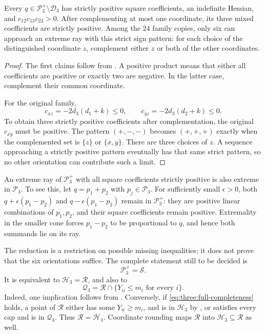 \begin{corollary}\label{three:reduction}
Every $q\in\mathcal P_3^+\setminus \mathcal D_3$ has strictly positive square
coefficients, an indefinite Hessian, and
$c_{12}c_{13}c_{23}>0$. After complementing at most one coordinate, its
three mixed coefficients are strictly positive. Among the $24$ family
copies, only six can approach an extreme ray with this strict sign
pattern: for each choice of the distinguished coordinate $z$, complement
either $z$ or both of the other coordinates.
\end{corollary}
\begin{proof}
The first claims follow from .
A positive product means that either all coefficients are positive or
exactly two are negative. In the latter case, complement their common
coordinate.

For the original family,
\[
 c_{xz}=-2d_3(d_1+k)\le0,\qquad
 c_{yz}=-2d_3(d_2+k)\le0.
\]
To obtain three strictly positive coefficients after complementation,
the original $c_{xy}$ must be positive. The pattern $(+,-,-)$ becomes
$(+,+,+)$ exactly when the complemented set is $\{z\}$ or $\{x,y\}$.
There are three choices of $z$. A sequence approaching a strictly positive
pattern eventually has that same strict pattern, so no other orientation
can contribute such a limit.
\end{proof}

An extreme ray of $\mathcal P_3^+$ with all square coefficients strictly
positive is also extreme in $\mathcal P_3$. To see this, let
$q=p_1+p_2$ with $p_j\in\mathcal P_3$. For sufficiently small
$\epsilon>0$, both $q+\epsilon(p_1-p_2)$ and
$q-\epsilon(p_1-p_2)$ remain in $\mathcal P_3^+$: they are positive
linear combinations of $p_1,p_2$, and their square coefficients remain
positive. Extremality in the smaller cone forces $p_1-p_2$ to be
proportional to $q$, and hence both summands lie on its ray.

The reduction is a restriction on possible missing inequalities; it does
not prove that the six orientations suffice. The complete statement
still to be decided is
\begin{equation}\label{eq:three:completeness}
 \mathcal P_3^+=\mathcal S.
\end{equation}
It is equivalent to $\mathcal H_3=\mathcal R$, and also to
\begin{equation}\label{eq:three:full-completeness}
 \mathcal Q_3=\mathcal R\cap\{Y_{ii}\le m_i\text{ for every }i\}.
\end{equation}
Indeed, one implication follows from . Conversely, if
\eqref{eq:three:full-completeness} holds, a point of $\mathcal R$ either has some
$Y_{ii}\ge m_i$, and is in $\mathcal H_3$ by
, or satisfies every cap and is in
$\mathcal Q_3$. Thus $\mathcal R=\mathcal H_3$. Coordinate rounding maps $\mathcal R$ into
$\mathcal H_3\subseteq \mathcal R$ as well.

